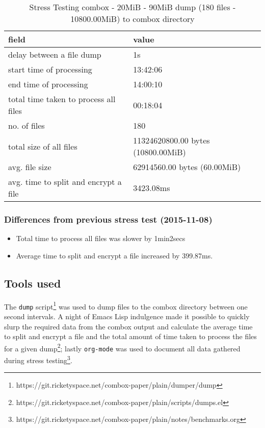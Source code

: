 \begin{center}
  \begin{table}[h]
    \begin{tabular}{ll}
      field & value\\
      \hline
      delay between a file dump & 1s\\
      start time of processing & 13:42:06\\
      end time of processing & 14:00:10\\
      total time taken to process all files & 00:18:04\\
      no. of files & 180\\
      total size of all files & 11324620800.00 bytes (10800.00MiB)\\
      avg. file size & 62914560.00 bytes (60.00MiB)\\
      avg. time to split and encrypt a file & 3423.08ms\\
    \end{tabular}
    \caption{Stress Testing combox - 20MiB - 90MiB dump (180 files - 10800.00MiB) to combox directory}
  \end{table}
\end{center}

\subsubsection{Differences from previous stress test (2015-11-08)}

\begin{itemize}
\item Total time to process all files was slower by 1min2secs
\item Average time to split and encrypt a file increased by 399.87ms.
\end{itemize}

\subsection{Tools used}\label{4-st-tu}

The \verb+dump+
script\footnote{https://git.ricketyspace.net/combox-paper/plain/dumper/dump}
was used to dump files to the combox directory between one second
intervals. A night of Emacs Lisp indulgence made it possible to
quickly slurp the required data from the combox output and calculate
the average time to split and encrypt a file and the total amount of
time taken to process the files for a given
dump\footnote{https://git.ricketyspace.net/combox-paper/plain/scripts/dumps.el};
lastly \verb+org-mode+ was used to document all data gathered during
stress
testing\footnote{https://git.ricketyspace.net/combox-paper/plain/notes/benchmarks.org}.

